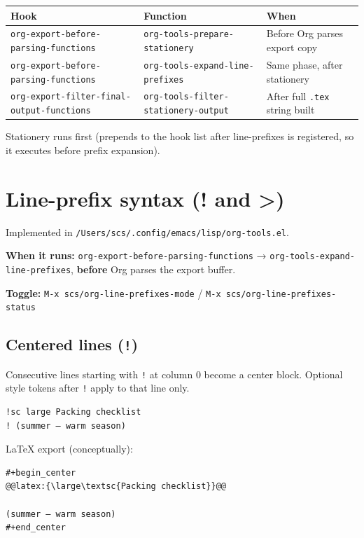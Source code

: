 \documentclass[11pt]{article}
\begin{document}
\begin{center}
\begin{tabular}{lll}
Hook & Function & When\\
\hline
\texttt{org-export-before-parsing-functions} & \texttt{org-tools-prepare-stationery} & Before Org parses export copy\\
\texttt{org-export-before-parsing-functions} & \texttt{org-tools-expand-line-prefixes} & Same phase, after stationery\\
\texttt{org-export-filter-final-output-functions} & \texttt{org-tools-filter-stationery-output} & After full \texttt{.tex} string built\\
\end{tabular}
\end{center}

Stationery runs first (prepends to the hook list after line-prefixes is
registered, so it executes before prefix expansion).
\section*{Line-prefix syntax (! and >)}
\label{sec:orgf68d14d}

Implemented in \texttt{/Users/scs/.config/emacs/lisp/org-tools.el}.

\textbf{\textbf{When it runs:}} \texttt{org-export-before-parsing-functions} →
\texttt{org-tools-expand-line-prefixes}, \textbf{before} Org parses the export buffer.

\textbf{\textbf{Toggle:}} \texttt{M-x scs/org-line-prefixes-mode} / \texttt{M-x scs/org-line-prefixes-status}
\subsection*{Centered lines (\texttt{!})}
\label{sec:orgb53b462}

Consecutive lines starting with \texttt{!} at column 0 become a center block.
Optional style tokens after \texttt{!} apply to that line only.

\begin{verbatim}
!sc large Packing checklist
! (summer — warm season)
\end{verbatim}

\LaTeX{} export (conceptually):

\begin{verbatim}
#+begin_center
@@latex:{\large\textsc{Packing checklist}}@@

(summer — warm season)
#+end_center
\end{verbatim}
\end{document}
